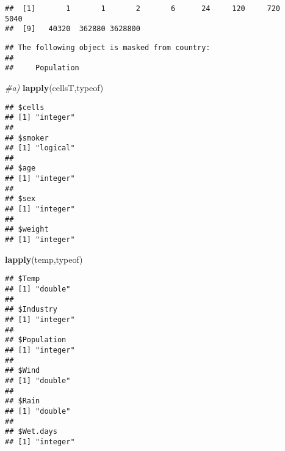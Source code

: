 \documentclass[]{article}
\newenvironment{Shaded}{\begin{snugshade}}{\end{snugshade}}
\newcommand{\CommentTok}[1]{\textcolor[rgb]{0.56,0.35,0.01}{\textit{#1}}}
\newcommand{\DataTypeTok}[1]{\textcolor[rgb]{0.13,0.29,0.53}{#1}}
\newcommand{\KeywordTok}[1]{\textcolor[rgb]{0.13,0.29,0.53}{\textbf{#1}}}
\newcommand{\NormalTok}[1]{#1}
\newcommand{\StringTok}[1]{\textcolor[rgb]{0.31,0.60,0.02}{#1}}
\begin{document}
\begin{verbatim}
##  [1]       1       1       2       6      24     120     720    5040
##  [9]   40320  362880 3628800
\end{verbatim}

\begin{Shaded}
\end{Shaded}

\begin{verbatim}
## The following object is masked from country:
## 
##     Population
\end{verbatim}

\begin{Shaded}
\begin{Highlighting}[]
\CommentTok{#a)}
\KeywordTok{lapply}\NormalTok{(cellsT,typeof)}
\end{Highlighting}
\end{Shaded}

\begin{verbatim}
## $cells
## [1] "integer"
## 
## $smoker
## [1] "logical"
## 
## $age
## [1] "integer"
## 
## $sex
## [1] "integer"
## 
## $weight
## [1] "integer"
\end{verbatim}

\begin{Shaded}
\begin{Highlighting}[]
\KeywordTok{lapply}\NormalTok{(temp,typeof)}
\end{Highlighting}
\end{Shaded}

\begin{verbatim}
## $Temp
## [1] "double"
## 
## $Industry
## [1] "integer"
## 
## $Population
## [1] "integer"
## 
## $Wind
## [1] "double"
## 
## $Rain
## [1] "double"
## 
## $Wet.days
## [1] "integer"
\end{verbatim}
\end{document}
